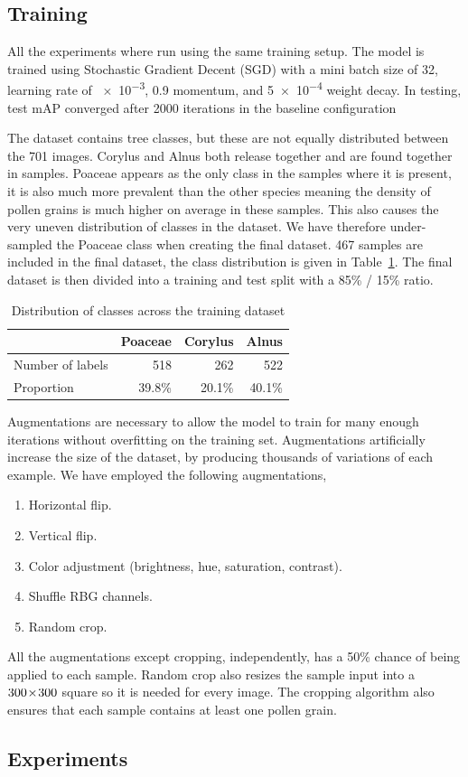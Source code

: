 \subsection{Training}
All the experiments where run using the same training setup.
The model is trained using Stochastic Gradient Decent (SGD) with a mini batch size of 32, learning rate of \num{e-3}, \num{0.9} momentum, and \num{5e-4} weight decay.
In testing, test mAP converged after 2000 iterations in the baseline configuration

The dataset contains tree classes, but these are not equally distributed between the 701 images. Corylus and Alnus both release together and are found together in samples.
Poaceae appears as the only class in the samples where it is present, it is also much more prevalent than the other species meaning the density of pollen grains is much higher on average in these samples.
This also causes the very uneven distribution of classes in the dataset.
We have therefore under-sampled the Poaceae class when creating the final dataset.
467 samples are included in the final dataset, the class distribution is given in Table~\ref{tab:training-dataset}.
The final dataset is then divided into a training and test split with a 85\% / 15\% ratio. 
 
\begin{table}[htb]
  \caption[Class distribution across the final training dataset containing 467 sample images.]{Distribution of classes across the training dataset}\label{tab:training-dataset}
  \centering 
  \begin{tabular}{lrrr} \toprule
                      & Poaceae & Corylus & Alnus \\ \midrule
    Number of labels  & 518    & 262     & 522 \\
    Proportion        & 39.8\%  & 20.1\%   & 40.1\% \\ \bottomrule
  \end{tabular}
\end{table}

Augmentations are necessary to allow the model to train for many enough iterations without overfitting on the training set.
Augmentations artificially increase the size of the dataset, by producing thousands of variations of each example.
We have employed the following augmentations,
%
\begin{enumerate}
  \item Horizontal flip.
  \item Vertical flip.
  \item Color adjustment (brightness, hue, saturation, contrast).
  \item Shuffle RBG channels.
  \item Random crop.
\end{enumerate}
%
All the augmentations except cropping, independently, has a 50\% chance of being applied to each sample. Random crop also resizes the sample input into a \(300\!\times \! 300\) square so it is needed for every image. The cropping algorithm also ensures that each sample contains at least one pollen grain.


\subsection{Experiments}